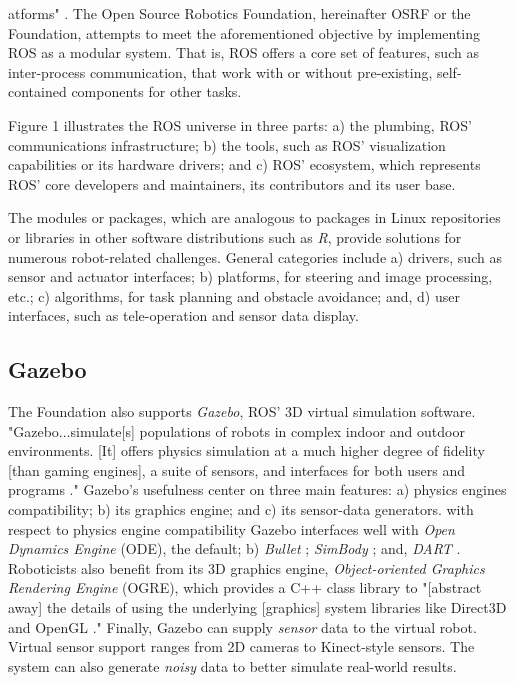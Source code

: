 \documentclass[9pt,twocolumn,twoside]{../../styles/osajnl}
\begin{document}
atforms" \cite{www-ros-about}. The Open Source Robotics Foundation, hereinafter OSRF or the Foundation, attempts to meet the aforementioned objective by implementing ROS as a modular system.  That is, ROS offers a core set of features, such as inter-process communication, that work with or without pre-existing, self-contained components for other tasks.

Figure 1 illustrates the ROS universe in three parts: a) the plumbing, ROS' communications infrastructure; b) the tools, such as ROS' visualization capabilities or its hardware drivers; and c) ROS' ecosystem, which represents ROS' core developers and maintainers, its contributors and its user base.

The modules or packages, which are analogous to packages in Linux repositories or libraries in other software distributions such as \textit{R}, provide solutions for numerous robot-related challenges.  General categories include a) drivers, such as sensor and actuator interfaces; b) platforms, for steering and image processing, etc.; c) algorithms, for task planning and obstacle avoidance; and, d) user interfaces, such as tele-operation and sensor data display. \cite{www-software-categories}

\subsection{Gazebo} %

The Foundation also supports \textit{Gazebo}, ROS' 3D virtual simulation software.  "Gazebo...simulate[s] populations of robots in complex indoor and outdoor environments. [It] offers physics simulation at a much higher degree of fidelity [than gaming engines], a suite of sensors, and interfaces for both users and programs \cite{www-gazebo-overview}."  Gazebo's usefulness center on three main features: a) physics engines compatibility; b) its graphics engine; and c) its sensor-data generators.  with respect to physics engine compatibility Gazebo interfaces well with \textit{Open Dynamics Engine} \cite{www-ode-homepage} (ODE), the default; b) \textit{Bullet} \cite{www-bullet-homepage}; \textit{SimBody} \cite{www-simbody-homepage}; and, \textit{DART} \cite{www-dart-homepage}. Roboticists also benefit from its 3D graphics engine, \textit{Object-oriented Graphics Rendering Engine} \cite{www-ogre-homepage} (OGRE), which provides a C++ class library to "[abstract away] the details of using the underlying [graphics] system libraries like Direct3D and OpenGL \cite{www-ogre-about}."  Finally, Gazebo can supply \textit{sensor} data to the virtual robot.  Virtual sensor support ranges from 2D cameras to Kinect-style sensors.  The system can also generate \textit{noisy} data to better simulate real-world results.
\end{document}
